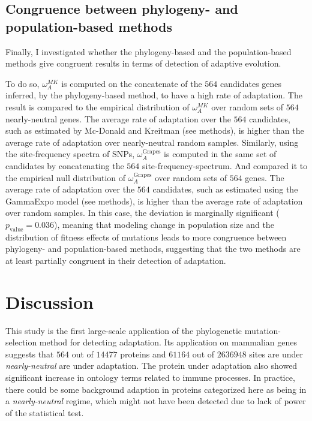 \documentclass{article}
\begin{document}
\subsection*{Congruence between phylogeny- and population-based methods}
Finally, I investigated whether the phylogeny-based and the population-based methods give congruent results in terms of detection of adaptive evolution.

To do so, $\omega_A^{MK}$ is computed on the concatenate of the $564$ candidates genes inferred, by the phylogeny-based method, to have a high rate of adaptation.
The result is compared to the empirical distribution of $\omega_A^{MK}$ over random sets of $564$ nearly-neutral genes.
The average rate of adaptation over the $564$ candidates, such as estimated by Mc-Donald and Kreitman (see methods), is higher than the average rate of adaptation over nearly-neutral random samples.
Similarly, using the site-frequency spectra of SNPs, $\omega_A^{\text{Grapes}}$ is computed in the same set of candidates by concatenating the $564$ site-frequency-spectrum.
And compared it to the empirical null distribution of $\omega_A^{\text{Grapes}}$ over random sets of $564$ genes.
The average rate of adaptation over the $564$ candidates, such as estimated using the GammaExpo model (see methods), is higher than the average rate of adaptation over random samples.
In this case, the deviation is marginally significant ($p_{\mathrm{value}}=0.036$),
meaning that modeling change in population size and the distribution of fitness effects of mutations leads to more congruence between phylogeny- and population-based methods, suggesting that the two methods are at least partially congruent in their detection of adaptation.

\section*{Discussion}

This study is the first large-scale application of the phylogenetic mutation-selection method for detecting adaptation.
Its application on mammalian genes suggests that $564$ out of $14477$ proteins and $61164$ out of $2636948$ sites are under \textit{nearly-neutral} are under adaptation.
The protein under adaptation also showed significant increase in ontology terms related to immune processes.
In practice, there could be some background adaption in proteins categorized here as being in a \textit{nearly-neutral} regime, which might not have been detected due to lack of power of the statistical test.
\end{document}
